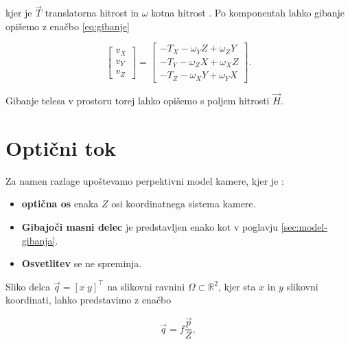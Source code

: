 kjer je $\vec{T}$ translatorna hitrost in $\omega$ kotna hitrost \cite{trucco1998introductory}. Po komponentah lahko gibanje opišemo z enačbo \eqref{eq:gibanje}

\begin{equation} \label{eq:gibanje}
	\begin{bmatrix}
	v_X \\ v_Y \\ v_Z
	\end{bmatrix}
    =
    \begin{bmatrix}
    - T_X - \omega_Y Z + \omega_Z Y \\
    - T_Y - \omega_Z X + \omega_X Z \\
    - T_Z - \omega_X Y + \omega_Y X
    \end{bmatrix}.
\end{equation}

Gibanje telesa v prostoru torej lahko opišemo s poljem hitrosti $\vec{H}$.










\section{Optični tok} \label{sec:opticni-tok}
Za namen razlage upoštevamo perpektivni model kamere, kjer je \cite{trucco1998introductory}:

\begin{itemize}
\item \textbf{optična os} enaka $Z$ osi koordinatnega sistema kamere.
\item \textbf{Gibajoči masni delec} je predstavljen enako kot v poglavju \ref{sec:model-gibanja}.
\item \textbf{Osvetlitev} se ne spreminja.
\end{itemize}

Sliko delca $\vec{q} = [x~y]^\top$ na slikovni ravnini $\mathit{\Omega} \subset \mathbb{R}^2$, kjer sta $x$ in $y$ slikovni koordinati, lahko predstavimo z enačbo

\begin{equation}\label{eq:slika-delca}
	\vec{q} = f \frac{\vec{p}}{Z},
\end{equation}

